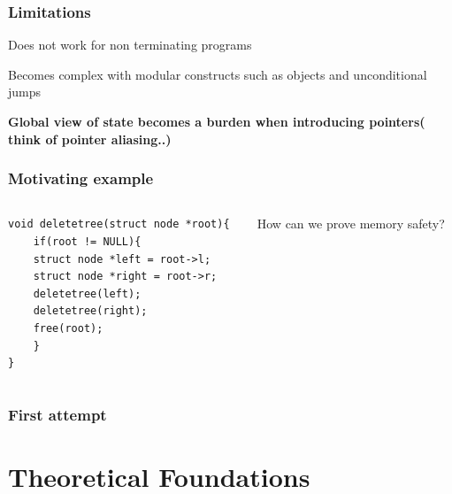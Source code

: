 \documentclass[professionalfont]{beamer}
\begin{document}
    \begin{frame}
        \frametitle{Limitations}
        
        Does not work for non terminating programs 
        \pause    
        \bigskip
        
        Becomes complex with modular constructs such as objects and unconditional jumps
        \pause
        \bigskip

        \textbf{Global view of state becomes a burden when introducing pointers( think of pointer aliasing..)}

        
    \end{frame}
\begin{frame}[fragile]
    \frametitle{Motivating example}
        \begin{columns}
    \begin{column}{0.7\textwidth}
    \begin{lstlisting}
void deletetree(struct node *root){
    if(root != NULL){
    struct node *left = root->l;
    struct node *right = root->r;
    deletetree(left);
    deletetree(right);
    free(root);
    }
}
    \end{lstlisting}
        \end{column}
            \begin{column}{0.3\textwidth}
                How can we prove memory safety?
            \end{column}
        \end{columns}
    \end{frame}
    \begin{frame}
        \frametitle{First attempt}

        
    \end{frame}
    \section{Theoretical Foundations}
\end{document}
